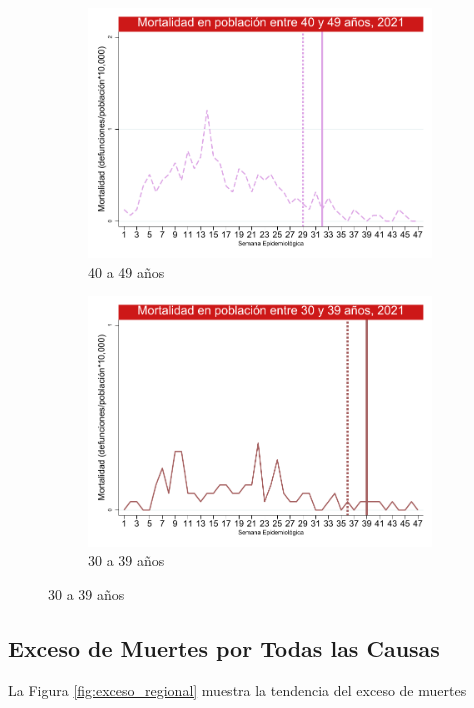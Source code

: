 \documentclass[12pt,a4paper,openany]{book}
\begin{document}
\begin{figure}[h]
	\vspace{10mm}
	\begin{subfigure}[b]{0.45\textwidth}
		\centering
		\includegraphics[width=\textwidth]{../figuras/mortalidad_edad_40.pdf}
		\caption{40 a 49 años}
	\end{subfigure}
	\hfill
	\begin{subfigure}[b]{0.45\textwidth}
		\centering
		\includegraphics[width=\textwidth]{../figuras/mortalidad_edad_30.pdf}
		\caption{30 a 39 años}
	\end{subfigure}
	\end{figure}

\clearpage
	
	\subsection*{Exceso de Muertes por Todas las Causas}
	\noindent  La Figura \ref{fig:exceso_regional} muestra la tendencia del exceso de muertes 
	
\end{document}
